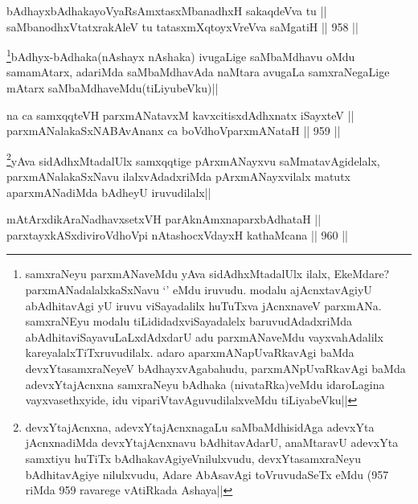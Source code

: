 
\begin{shl}
bAdhayxbAdhakayoVyaRsAmxtasxMbanadhxH sakaqdeVva tu || \\
saMbanodhxVtatxrakAleV tu tatasxmXqtoyxVreVva saMgatiH ||  958 ||  
\end{shl}

\begin{artha}
\footnote{samxraNeyu parxmANaveMdu yAva sidAdhxMtadalUlx ilalx, EkeMdare? parxmANadalalxkaSxNavu `\stext' eMdu iruvudu. modalu ajAcnxtavAgiyU abAdhitavAgi yU iruvu viSayadalilx huTuTxva jAcnxnaveV parxmANa. samxraNEyu modalu tiLididadxviSayadalelx baruvudAdadxriMda abAdhitaviSayavuLaLxdAdxdarU adu parxmANaveMdu vayxvahAdalilx kareyalalxTiTxruvudilalx. adaro aparxmANapUvaRkavAgi baMda devxYtasamxraNeyeV bAdhayxvAgabahudu, parxmANpUvaRkavAgi baMda adevxYtajAcnxna samxraNeyu bAdhaka (nivataRka)veMdu idaroLagina vayxvasethxyide, idu vipariVtavAguvudilalxveMdu tiLiyabeVku||}bAdhyx-bAdhaka(nAshayx nAshaka) ivugaLige saMbaMdhavu oMdu samamAtarx, adariMda saMbaMdhavAda naMtara avugaLa samxraNegaLige mAtarx saMbaMdhaveMdu(tiLiyubeVku)||
\end{artha}


\begin{shl}
na ca samxqqteVH parxmANatavxM kavxcitisxdAdhxnatx iSayxteV ||  \\
parxmANalakaSxNABAvAnanx ca boVdhoV\s parxmANataH ||  959 ||  
\end{shl}

\begin{artha}
\footnote{devxYtajAcnxna, adevxYtajAcnxnagaLu saMbaMdhisidAga adevxYta jAcnxnadiMda devxYtajAcnxnavu bAdhitavAdarU, anaMtaravU adevxYta samxtiyu huTiTx bAdhakavAgiyeVnilulxvudu, devxYtasamxraNeyu bAdhitavAgiye nilulxvudu, Adare AbAsavAgi toVruvudaSeTx eMdu (957 riMda 959 ravarege vAtiRkada Ashaya||}yAva sidAdhxMtadalUlx samxqqtige pArxmANayxvu saMmatavAgidelalx, parxmANalakaSxNavu ilalxvAdadxriMda pArxmANayxvilalx matutx aparxmANadiMda bAdheyU iruvudilalx||
\end{artha}


\begin{shl}
mAtArxdikAraNadhavxsetxVH parAknAmxnaparxbAdhataH || \\
parxtayxkASxdiviroVdhoV\s pi nAtashocxVdayxH kathaMcana ||  960 ||  
\end{shl}

